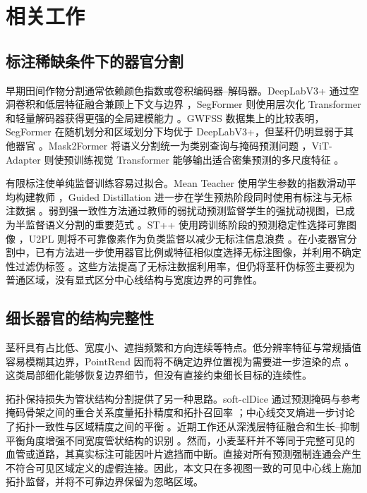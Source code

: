 \section{相关工作}
\label{sec:related-work}

\subsection{标注稀缺条件下的器官分割}

早期田间作物分割通常依赖颜色指数或卷积编码器--解码器。DeepLabV3+ 通过空洞卷积和低层特征融合兼顾上下文与边界 \citep{chen2018deeplabv3plus}，SegFormer 则使用层次化 Transformer 和轻量解码器获得更强的全局建模能力 \citep{xie2021segformer}。GWFSS 数据集上的比较表明，SegFormer 在随机划分和区域划分下均优于 DeepLabV3+，但茎秆仍明显弱于其他器官 \citep{wang2025gwfss}。Mask2Former 将语义分割统一为类别查询与掩码预测问题 \citep{cheng2022mask2former}，ViT-Adapter 则使预训练视觉 Transformer 能够输出适合密集预测的多尺度特征 \citep{chen2023vitadapter}。

有限标注使单纯监督训练容易过拟合。Mean Teacher 使用学生参数的指数滑动平均构建教师 \citep{tarvainen2017mean}，Guided Distillation 进一步在学生预热阶段同时使用有标注与无标注数据 \citep{berrada2024guided}。弱到强一致性方法通过教师的弱扰动预测监督学生的强扰动视图，已成为半监督语义分割的重要范式 \citep{yang2023unimatch}。ST++ 使用跨训练阶段的预测稳定性选择可靠图像 \citep{yang2022stpp}，U2PL 则将不可靠像素作为负类监督以减少无标注信息浪费 \citep{wang2022u2pl}。在小麦器官分割中，已有方法进一步使用器官比例或特征相似度选择无标注图像，并利用不确定性过滤伪标签 \citep{cao2025detailminority,ghosh2025decon}。这些方法提高了无标注数据利用率，但仍将茎秆伪标签主要视为普通区域，没有显式区分中心线结构与宽度边界的可靠性。

\subsection{细长器官的结构完整性}

茎秆具有占比低、宽度小、遮挡频繁和方向连续等特点。低分辨率特征与常规插值容易模糊其边界，PointRend 因而将不确定边界位置视为需要进一步渲染的点 \citep{kirillov2020pointrend}。这类局部细化能够恢复边界细节，但没有直接约束细长目标的连续性。

拓扑保持损失为管状结构分割提供了另一种思路。soft-clDice 通过预测掩码与参考掩码骨架之间的重合关系度量拓扑精度和拓扑召回率 \citep{shit2021cldice}；中心线交叉熵进一步讨论了拓扑一致性与区域精度之间的平衡 \citep{acebes2024clce}。近期工作还从深浅层特征融合和生长--抑制平衡角度增强不同宽度管状结构的识别 \citep{huang2025harmonyseg}。然而，小麦茎秆并不等同于完整可见的血管或道路，其真实标注可能因叶片遮挡而中断。直接对所有预测强制连通会产生不符合可见区域定义的虚假连接。因此，本文只在多视图一致的可见中心线上施加拓扑监督，并将不可靠边界保留为忽略区域。

